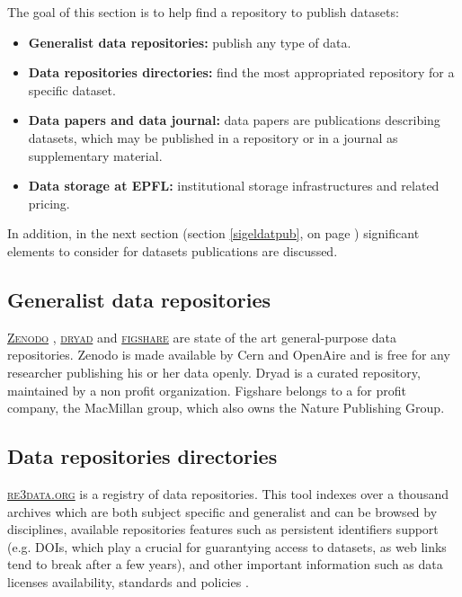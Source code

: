 The goal of this section is to help find a repository to publish datasets:
\begin{itemize}
\item \textbf{Generalist data repositories:} publish any type of data.
\item \textbf{Data repositories directories:} find the most appropriated repository for a specific dataset.
\item \textbf{Data papers and data journal:} data papers are publications describing datasets, which may be published in a repository or in a journal as supplementary material.
\item \textbf{Data storage at EPFL:} institutional storage infrastructures and related pricing.
\end{itemize}

In addition, in the next section (section \ref{sigeldatpub}, on page \pageref{sigeldatpub}) significant elements to consider for datasets publications are discussed.

\subsection{Generalist data repositories}
\label{repositories_generalist}

\noindent {} \textsc{\href{http://zenodo.org}{Zenodo}} \cite{zenodo_zenodo_2015},  \textsc{\href{http://datadryad.org/}{dryad}} \cite{dryad_dryad_2015}  and  \textsc{\href{http://figshare.com/}{figshare}} \cite{figshare_figshare_2015} are state of the art general-purpose data repositories. Zenodo is made available by Cern and OpenAire and is free for any researcher publishing his or her data openly. Dryad is a curated repository, maintained by a non profit organization. Figshare belongs to a for profit company, the MacMillan group, which also owns the Nature Publishing Group.

\subsection{Data repositories directories}
\label{repositories_directories}

\noindent {} \textsc{\href{http://re3data.org}{re3data.org}} is a registry of data repositories. This tool indexes over a thousand archives which are both subject specific and generalist and can be browsed by disciplines, available repositories features such as persistent identifiers support (e.g. DOIs, which play a crucial for guarantying access to datasets, as web links tend to break after a few years), and other important information such as data licenses availability, standards and policies \cite{re3data_re3data.org_2015}.


